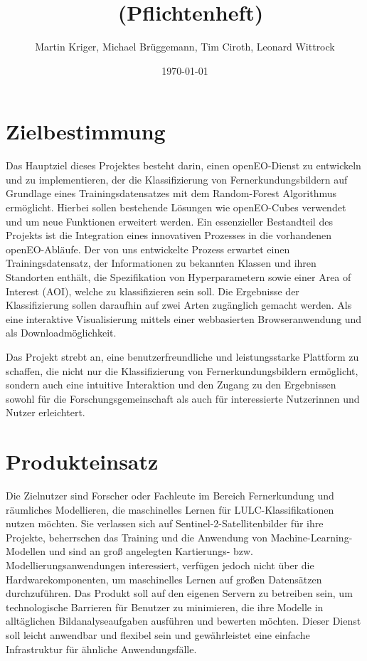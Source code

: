 \documentclass[a4paper,12pt]{article}
\title{\projektName~(Pflichtenheft)}
\author{Martin Kriger, Michael Brüggemann, Tim Ciroth, Leonard Wittrock}
\date{\today}
\begin{document}
 \setcounter{page}{3}
 \tableofcontents          %
 \clearpage

\section{Zielbestimmung} \label{zielbestimmung}
Das Hauptziel dieses Projektes besteht darin, einen openEO-Dienst zu entwickeln und zu implementieren, der die Klassifizierung von Fernerkundungsbildern auf Grundlage eines Trainingsdatensatzes mit dem Random-Forest Algorithmus ermöglicht. Hierbei sollen bestehende Lösungen wie openEO-Cubes verwendet und um neue Funktionen erweitert werden. Ein essenzieller Bestandteil des Projekts ist die Integration eines innovativen Prozesses in die vorhandenen openEO-Abläufe. Der von uns entwickelte Prozess erwartet einen Trainingsdatensatz, der Informationen zu bekannten Klassen und ihren Standorten enthält, die Spezifikation von Hyperparametern sowie einer Area of Interest (AOI), welche zu klassifizieren sein soll. Die Ergebnisse der Klassifizierung sollen daraufhin auf zwei Arten zugänglich gemacht werden. Als eine interaktive Visualisierung mittels einer webbasierten Browseranwendung und als Downloadmöglichkeit.
\par
Das Projekt strebt an, eine benutzerfreundliche und leistungsstarke Plattform zu schaffen, die nicht nur die Klassifizierung von Fernerkundungsbildern ermöglicht, sondern auch eine intuitive Interaktion und den Zugang zu den Ergebnissen sowohl für die Forschungsgemeinschaft als auch für interessierte Nutzerinnen und Nutzer erleichtert.

\section{Produkteinsatz} \label{produkteinsatz}
Die Zielnutzer sind Forscher oder Fachleute im Bereich Fernerkundung und räumliches Modellieren, die maschinelles Lernen für LULC-Klassifikationen nutzen möchten. Sie verlassen sich auf Sentinel-2-Satellitenbilder für ihre Projekte, beherrschen das Training und die Anwendung von Machine-Learning-Modellen und sind an groß angelegten Kartierungs- bzw. Modellierungsanwendungen interessiert, verfügen jedoch nicht über die Hardwarekomponenten, um maschinelles Lernen auf großen Datensätzen durchzuführen. Das Produkt soll auf den eigenen Servern zu betreiben sein, um technologische Barrieren für Benutzer zu minimieren, die ihre Modelle in alltäglichen Bildanalyseaufgaben ausführen und bewerten möchten. Dieser Dienst soll leicht anwendbar und flexibel sein und gewährleistet eine einfache Infrastruktur für ähnliche Anwendungsfälle.
\end{document}
